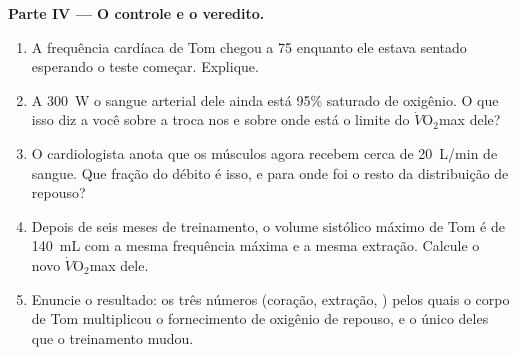 \begin{problem}
\medskip
\noindent\textbf{Parte IV --- O controle e o veredito.}
\begin{enumerate}[resume]
  \item A frequência cardíaca de Tom chegou a 75 enquanto ele estava
        sentado esperando o teste começar. Explique.
  \item A \qty{300}{W} o sangue arterial dele ainda está 95\% saturado
        de oxigênio. O que isso diz a você sobre a troca nos  e
        sobre onde está o limite do $\dot V\!\mathrm{O_2}$max dele?
  \item O cardiologista anota que os músculos agora recebem cerca de
        \qty{20}{L/min} de sangue. Que fração do débito é isso, e para
        onde foi o resto da distribuição de repouso?
  \item Depois de seis meses de treinamento, o volume sistólico máximo
        de Tom é de \qty{140}{mL} com a mesma frequência máxima e a
        mesma extração. Calcule o novo $\dot V\!\mathrm{O_2}$max dele.
  \item Enuncie o resultado: os três números (coração, extração,
        ) pelos quais o corpo de Tom multiplicou o
        fornecimento de oxigênio de repouso, e o único deles que o
        treinamento mudou.
\end{enumerate}
\end{problem}
